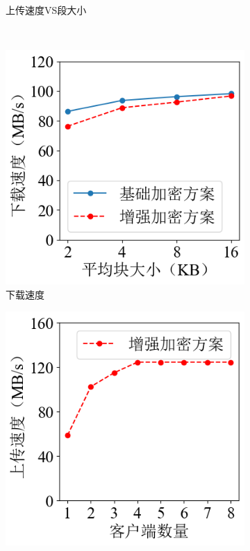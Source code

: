 \documentclass[promaster]{thesis-uestc}
\begin{document}
\begin{figure}[h]
\begin{subfigure}{0.40\textwidth}
        \centering
        \captionsetup{width=\textwidth}
        \caption{上传速度VS段大小}
        \label{上传下载速度2}
    \end{subfigure}\\
    \begin{subfigure}{0.40\textwidth}
        \includegraphics[width=1\linewidth]{pic/download_chunk_size.png}
        \centering
        \captionsetup{width=\textwidth}
        \caption{下载速度}
        \label{上传下载速度3}
    \end{subfigure}
    \begin{subfigure}{0.40\textwidth}
        \includegraphics[width=1\linewidth]{pic/upload_client.png}

\end{subfigure}
\end{figure}
\end{document}
